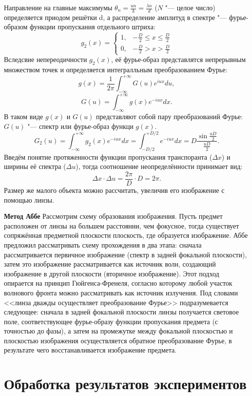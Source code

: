 \documentclass[a4paper, 12pt]{article}%
\begin{document}
Направление на главные максимумы $\theta_n = \frac{u n}{k} = \frac{\lambda n}{d}$ ($N$ "--- целое число) определяется приодом решётки d, а распределение амплитуд в спектре "--- фурье-образом функции пропускания отдельного штриха:
\[
g_2 (x) = \begin{cases} 1, & - \frac{D}{2} \leq x \leq \frac{D}{2} \\
						0, & - \frac{D}{2} > x > \frac{D}{2}
\end{cases}
\]
Вследсвие непереодичности $g_2(x)$, её фурье-образ представлятся непрерывным множеством точек и определяется интегралльным преобразованием Фурье:
\[
g(x) = \frac{1}{2 \pi} \int_{-\infty}^{+\infty} G(u) e^{iux} du,
\]
\[
G(u) = \int_{-\infty}^{+\infty} g(x) e^{-iux}dx.
\]
В таком виде $g(x)$ и $G(u)$ представляют собой пару преобразований Фурье: $G(u)$ "--- спектр или фурье-образ функци $g(x)$.
\[
	G_2 (u) = \int_{-\infty}^{+\infty} g_2 (x) e^{-iux} dx  = \int_{-D/2}^{+D/2} e^{-iux} dx = D \frac{\sin \frac{uD}{2}}{\frac{uD}{2}}.
\]
Введём понятие протяженности функции пропускания транспоранта ($\Delta x$) и ширины её спектра ($\Delta u$), тогда соотношение неопределённости принимает вид:
\[
	\Delta x \cdot \Delta u = \frac{2 \pi}{D} \cdot D = 2 \pi.
\]
Размер же малого объекта можно рассчитать, увеличив его изображение с помощью линзы.

\textbf{Метод Аббе}
Рассмотрим схему образования изображения. Пусть предмет расположен от линзы на большем расстоянии, чем фокусное, тогда существует сопряжённая предметной плоскости плоскость, где образуется изображение. Аббе предложил рассматривать схему прохождения в два этапа: сначала рассматривается первичное изображение (спектр в задней фокальной плоскости), затем это изображение рассматривается как источник волн, создающий изображение в другой плоскости (вторичное изображение). Этот подход опирается на принцип Гюйгенса-Френеля, согласно которому любой участок волнового фронта можно рассматривать как источник излучения. Под словами <<линза дважды осуществляет преобразование Фурье>> подразумевается следующее: сначала в задней фокальной плоскости линзы получается световое поле, соответствующее фурье-образу функции пропускания предмета (с точностью до фазы), а затем на промежутке между фокальной плоскостью и плоскостью изображения осуществляется обратное преобразование Фурье, в результате чего восстанавливается изображение предмета.

\newpage

\section*{Обработка результатов экспериментов}
\end{document}
